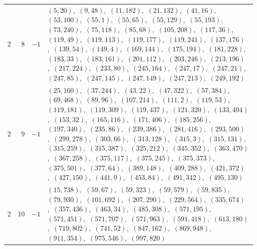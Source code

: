 \documentclass[11pt]{article}
\begin{document}
\begin{longtable}{@{}rrl>{\raggedright\arraybackslash}p{}@{}}
2 & 8 & $-1$ & $(5,20)$,\allowbreak\ $(9,48)$,\allowbreak\ $(11,182)$,\allowbreak\ $(21,132)$,\allowbreak\ $(41,16)$,\allowbreak\ $(53,100)$,\allowbreak\ $(55,1)$,\allowbreak\ $(55,65)$,\allowbreak\ $(55,129)$,\allowbreak\ $(55,193)$,\allowbreak\ $(73,240)$,\allowbreak\ $(75,118)$,\allowbreak\ $(85,68)$,\allowbreak\ $(105,208)$,\allowbreak\ $(117,36)$,\allowbreak\ $(119,49)$,\allowbreak\ $(119,113)$,\allowbreak\ $(119,177)$,\allowbreak\ $(119,241)$,\allowbreak\ $(137,176)$,\allowbreak\ $(139,54)$,\allowbreak\ $(149,4)$,\allowbreak\ $(169,144)$,\allowbreak\ $(175,194)$,\allowbreak\ $(181,228)$,\allowbreak\ $(183,33)$,\allowbreak\ $(183,161)$,\allowbreak\ $(201,112)$,\allowbreak\ $(203,246)$,\allowbreak\ $(213,196)$,\allowbreak\ $(217,224)$,\allowbreak\ $(233,80)$,\allowbreak\ $(245,164)$,\allowbreak\ $(247,17)$,\allowbreak\ $(247,21)$,\allowbreak\ $(247,85)$,\allowbreak\ $(247,145)$,\allowbreak\ $(247,149)$,\allowbreak\ $(247,213)$,\allowbreak\ $(249,192)$\\
2 & 9 & $-1$ & $(25,160)$,\allowbreak\ $(37,244)$,\allowbreak\ $(43,22)$,\allowbreak\ $(47,322)$,\allowbreak\ $(57,384)$,\allowbreak\ $(69,468)$,\allowbreak\ $(89,96)$,\allowbreak\ $(107,214)$,\allowbreak\ $(111,2)$,\allowbreak\ $(119,53)$,\allowbreak\ $(119,181)$,\allowbreak\ $(119,309)$,\allowbreak\ $(119,437)$,\allowbreak\ $(121,320)$,\allowbreak\ $(133,404)$,\allowbreak\ $(153,32)$,\allowbreak\ $(165,116)$,\allowbreak\ $(171,406)$,\allowbreak\ $(185,256)$,\allowbreak\ $(197,340)$,\allowbreak\ $(235,86)$,\allowbreak\ $(239,386)$,\allowbreak\ $(281,416)$,\allowbreak\ $(293,500)$,\allowbreak\ $(299,278)$,\allowbreak\ $(303,66)$,\allowbreak\ $(313,128)$,\allowbreak\ $(315,3)$,\allowbreak\ $(315,131)$,\allowbreak\ $(315,259)$,\allowbreak\ $(315,387)$,\allowbreak\ $(325,212)$,\allowbreak\ $(345,352)$,\allowbreak\ $(363,470)$,\allowbreak\ $(367,258)$,\allowbreak\ $(375,117)$,\allowbreak\ $(375,245)$,\allowbreak\ $(375,373)$,\allowbreak\ $(375,501)$,\allowbreak\ $(377,64)$,\allowbreak\ $(389,148)$,\allowbreak\ $(409,288)$,\allowbreak\ $(421,372)$,\allowbreak\ $(427,150)$,\allowbreak\ $(441,0)$,\allowbreak\ $(453,84)$,\allowbreak\ $(491,342)$,\allowbreak\ $(495,130)$\\
2 & 10 & $-1$ & $(15,738)$,\allowbreak\ $(59,67)$,\allowbreak\ $(59,323)$,\allowbreak\ $(59,579)$,\allowbreak\ $(59,835)$,\allowbreak\ $(79,930)$,\allowbreak\ $(101,692)$,\allowbreak\ $(207,290)$,\allowbreak\ $(229,564)$,\allowbreak\ $(335,674)$,\allowbreak\ $(357,436)$,\allowbreak\ $(463,34)$,\allowbreak\ $(485,308)$,\allowbreak\ $(571,195)$,\allowbreak\ $(571,451)$,\allowbreak\ $(571,707)$,\allowbreak\ $(571,963)$,\allowbreak\ $(591,418)$,\allowbreak\ $(613,180)$,\allowbreak\ $(719,802)$,\allowbreak\ $(741,52)$,\allowbreak\ $(847,162)$,\allowbreak\ $(869,948)$,\allowbreak\ $(911,354)$,\allowbreak\ $(975,546)$,\allowbreak\ $(997,820)$\\

\end{longtable}
\end{document}
